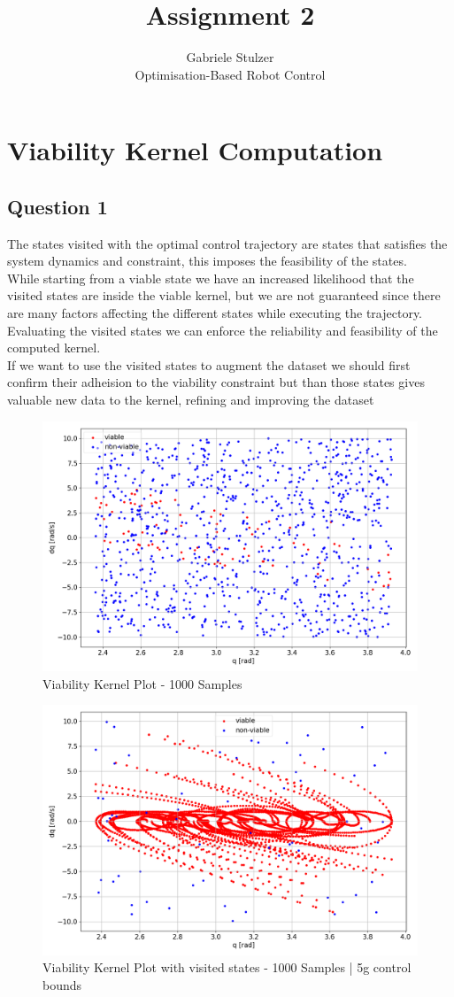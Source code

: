 \documentclass[12pt]{article}
\begin{document}
\title{Assignment 2}
\author{Gabriele Stulzer\\ 
Optimisation-Based Robot Control}
 
\maketitle

\section*{Viability Kernel Computation}
 
\subsection*{Question 1}
\textit{}
The states visited with the optimal control trajectory are states that satisfies the system dynamics and constraint, this imposes the feasibility of the states.\\
While starting from a viable state we have an increased likelihood that the visited states are inside the viable kernel, but we are not guaranteed since there are many factors affecting the different states
while executing the trajectory.\\
Evaluating the visited states we can enforce the reliability and feasibility of the computed kernel.\\
If we want to use the visited states to augment the dataset we should first confirm their adheision to the viability constraint but than those states gives valuable new data to the kernel, refining and improving the dataset

\begin{figure}[h!]
    \centering
    \includegraphics[width=0.5\linewidth]{ViabilityKernelPlot.png}
    \caption{Viability Kernel Plot - 1000 Samples}\label{fig:oscvsic}
\end{figure}

\begin{figure}[h!]
    \centering
    \includegraphics[width=0.5\linewidth]{UsingComputedStatesInKernelSet.png}
    \caption{Viability Kernel Plot with visited states - 1000 Samples | 5g control bounds}\label{fig:oscvsic}
\end{figure}
\end{document}
